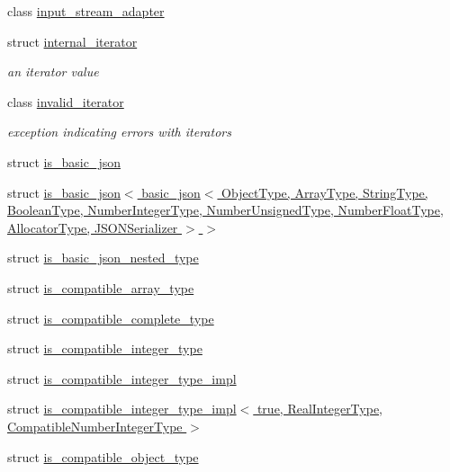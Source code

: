 \begin{DoxyCompactItemize}
class \hyperlink{classnlohmann_1_1detail_1_1input__stream__adapter}{input\+\_\+stream\+\_\+adapter}
\item 
struct \hyperlink{structnlohmann_1_1detail_1_1internal__iterator}{internal\+\_\+iterator}
\begin{DoxyCompactList}\small\item\em an iterator value \end{DoxyCompactList}\item 
class \hyperlink{classnlohmann_1_1detail_1_1invalid__iterator}{invalid\+\_\+iterator}
\begin{DoxyCompactList}\small\item\em exception indicating errors with iterators \end{DoxyCompactList}\item 
struct \hyperlink{structnlohmann_1_1detail_1_1is__basic__json}{is\+\_\+basic\+\_\+json}
\item 
struct \hyperlink{structnlohmann_1_1detail_1_1is__basic__json_3_01basic__json_3_01_object_type_00_01_array_type_0003b7300f70a161f2a79dcaaba1e567bb}{is\+\_\+basic\+\_\+json$<$ basic\+\_\+json$<$ Object\+Type, Array\+Type, String\+Type, Boolean\+Type, Number\+Integer\+Type, Number\+Unsigned\+Type, Number\+Float\+Type, Allocator\+Type, J\+S\+O\+N\+Serializer $>$ $>$}
\item 
struct \hyperlink{structnlohmann_1_1detail_1_1is__basic__json__nested__type}{is\+\_\+basic\+\_\+json\+\_\+nested\+\_\+type}
\item 
struct \hyperlink{structnlohmann_1_1detail_1_1is__compatible__array__type}{is\+\_\+compatible\+\_\+array\+\_\+type}
\item 
struct \hyperlink{structnlohmann_1_1detail_1_1is__compatible__complete__type}{is\+\_\+compatible\+\_\+complete\+\_\+type}
\item 
struct \hyperlink{structnlohmann_1_1detail_1_1is__compatible__integer__type}{is\+\_\+compatible\+\_\+integer\+\_\+type}
\item 
struct \hyperlink{structnlohmann_1_1detail_1_1is__compatible__integer__type__impl}{is\+\_\+compatible\+\_\+integer\+\_\+type\+\_\+impl}
\item 
struct \hyperlink{structnlohmann_1_1detail_1_1is__compatible__integer__type__impl_3_01true_00_01_real_integer_type78b0ba77f36a8c8169cdb79b01d1a4bf}{is\+\_\+compatible\+\_\+integer\+\_\+type\+\_\+impl$<$ true, Real\+Integer\+Type, Compatible\+Number\+Integer\+Type $>$}
\item 
struct \hyperlink{structnlohmann_1_1detail_1_1is__compatible__object__type}{is\+\_\+compatible\+\_\+object\+\_\+type}

\end{DoxyCompactItemize}
